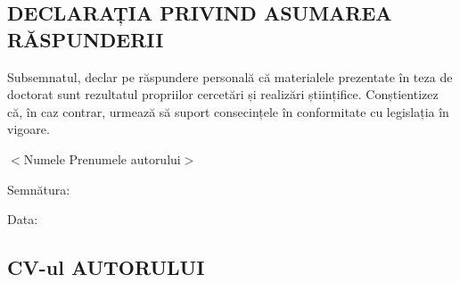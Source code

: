 \documentclass[a4paper, 12pt]{report}
\begin{document}
\begin{center}
\section*{\bf DECLARAȚIA PRIVIND ASUMAREA RĂSPUNDERII}
\end{center}

\strut

Subsemnatul, declar pe răspundere personală că materialele prezentate în teza de doctorat sunt rezultatul propriilor cercetări și realizări științifice. Conștientizez că, în caz contrar, urmează să suport consecințele în conformitate cu legislația în vigoare. 

\vspace{3cm}
$<$Numele Prenumele autorului$>$


\vspace{1cm}
Semnătura:

\vspace{1cm}
Data:  

\newpage

\begin{center}
\section*{CV-ul AUTORULUI}
\end{center}

\end{document}
